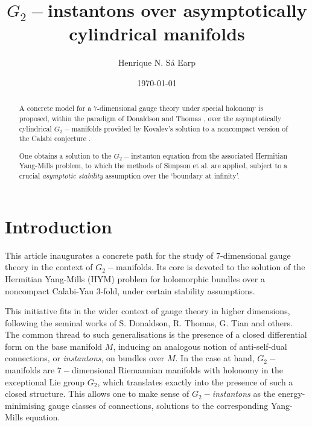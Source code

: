 \documentclass{article}
\title{$G_2-$instantons over asymptotically cylindrical manifolds}
\author{Henrique N. S\'a Earp}
\date{\today}
\begin{document}

\maketitle

\begin{abstract}
    A concrete model for a 7-dimensional gauge theory under special holonomy  is proposed, within
the paradigm of Donaldson and Thomas \cite{Donaldson-Thomas}, over the asymptotically cylindrical $G_2-$manifolds provided by Kovalev's solution to a noncompact version of the Calabi conjecture \cite{kovalevzinho,kovalevzao}. 

One obtains a solution to the $G_2-$instanton equation  from the associated Hermitian Yang-Mills problem, to which the methods of Simpson et al. are applied, subject to a crucial \emph{asymptotic stability} assumption over the `boundary at infinity'. 
\end{abstract}



\tableofcontents


\setcounter{section}{0}
\section*{Introduction}

This article inaugurates a concrete path for the study of 7-dimensional gauge theory in the context of  $G_2-$manifolds. Its core is devoted to the solution of the Hermitian Yang-Mills (HYM) problem for holomorphic bundles over a noncompact Calabi-Yau 3-fold, under certain stability assumptions. 


This initiative  fits in the wider context of gauge theory in higher
dimensions, following the seminal works of S. Donaldson, R. Thomas, G. Tian
and others. The common thread to such generalisations is the presence of a closed differential form on the base manifold $M$, inducing an
analogous notion of anti-self-dual connections, or \emph{instantons}, on
bundles over $M$. In the case at hand, $G_{2}-$manifolds are $7-$dimensional
Riemannian manifolds with holonomy in the exceptional Lie group $G_{2}$,
which translates exactly into the presence of such a closed structure. This
allows one to make sense of $G_{2}-$\emph{instantons} as the
energy-minimising gauge classes of connections, solutions to the
corresponding Yang-Mills equation.
\end{document}
